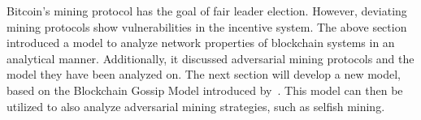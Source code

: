 Bitcoin's mining protocol has the goal of fair leader election. However, deviating mining protocols show vulnerabilities in the incentive system. The above section introduced a model to analyze network properties of blockchain systems in an analytical manner. Additionally, it discussed adversarial mining protocols and the model they have been analyzed on. The next section will develop a new model, based on the Blockchain Gossip Model introduced by~. This model can then be utilized to also analyze adversarial mining strategies, such as selfish mining.










